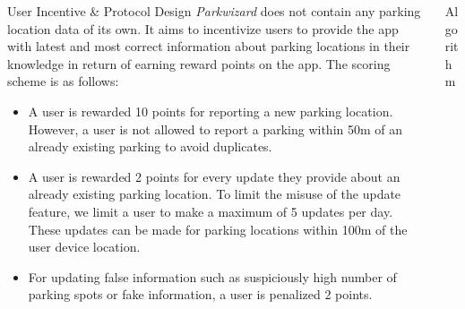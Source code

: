\documentclass[final]{beamer}
\newlength{\onecolwid}
\newlength{\twocolwid}
\begin{document}
\begin{frame}[t]
\begin{columns}[t]
\begin{column}{\onecolwid}
\begin{block}{User Incentive \& Protocol Design}
\textit{Parkwizard} does not contain any parking location data of its own. It aims to incentivize users to provide the app with latest and most correct information about parking locations in their knowledge in return of earning reward points on the app. The scoring scheme is as follows:
\begin{itemize}
    \item A user is rewarded 10 points for reporting a new parking location. However, a user is not allowed to report a parking within 50m of an already existing parking to avoid duplicates.

    \item A user is rewarded 2 points for every update they provide about an already existing parking location. To limit the misuse of the update feature, we limit a user to make a maximum of 5 updates per day. These updates can be made for parking locations within 100m of the user device location.

    \item For updating false information such as suspiciously high number of parking spots or fake information, a user is penalized 2 points.

\end{itemize}

\end{block}

\end{column} %

\begin{column}{\twocolwid} %

\begin{block}{Algorithm}


\end{block}
\end{column}
\end{columns}
\end{frame}
\end{document}
